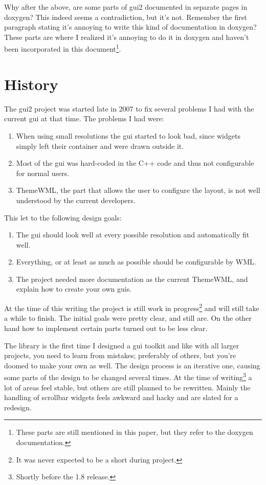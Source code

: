 Why after the above, are some parts of gui2 documented in separate pages in
doxygen? This indeed seems a contradiction, but it's not. Remember the first
paragraph stating it's annoying to write this kind of documentation in doxygen?
These parts are where I realized it's annoying to do it in doxygen and haven't
been incorporated in this document\footnote{These parts are still mentioned in
this paper, but they refer to the doxygen documentation.}.

\section{History}

The gui2 project was started late in 2007 to fix several problems I had with the
current gui at that time. The problems I had were:
\begin{enumerate}
\item When using small resolutions the gui started to look bad, since widgets
	simply left their container and were drawn outside it.
\item Most of the gui was hard-coded in the C++ code and thus not configurable
	for normal users.
\item ThemeWML, the part that allows the user to configure the layout, is not
	well understood by the current developers.
\end{enumerate}

This let to the following design goals:

\begin{enumerate}
\item The gui should look well at every possible resolution and automatically
	fit well.
\item Everything, or at least as much as possible should be configurable by WML.
\item The project needed more documentation as the current ThemeWML, and explain
	how to create your own guis.
\end{enumerate}

At the time of this writing the project is still work in progress\footnote{It
was never expected to be a short during project.} and will still take a while to
finish. The initial goals were pretty clear, and still are. On the other hand
how to implement certain parts turned out to be less clear.

The library is the first time I designed a gui toolkit and like with all larger
projects, you need to learn from mistakes; preferably of others, but you're doomed
to make your own as well. The design process is an iterative one, causing some
parts of the design to be changed several times. At the time of
writing\footnote{Shortly before the 1.8 release.} a lot of areas feel stable,
but others are still planned to be rewritten. Mainly the handling of scrollbar
widgets feels awkward and hacky and are slated for a redesign.

